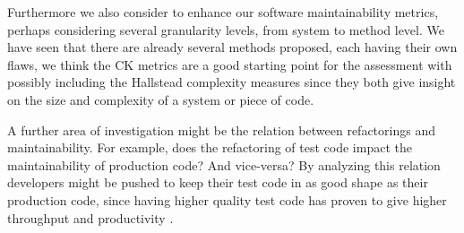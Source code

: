 Furthermore we also consider to enhance our software maintainability metrics, perhaps considering several granularity levels, from system to method level. We have seen that there are already several methods proposed, each having their own flaws, we think the CK metrics are a good starting point for the assessment with possibly including the Hallstead complexity measures \cite{halstead1977elements} since they both give insight on the size and complexity of a system or piece of code.

A further area of investigation might be the relation between refactorings and maintainability. For example, does the refactoring of test code impact the maintainability of production code? And vice-versa? By analyzing this relation developers might be pushed to keep their test code in as good shape as their production code, since having higher quality test code has proven to give higher throughput and productivity \cite{athanasiou2011constructing}. 